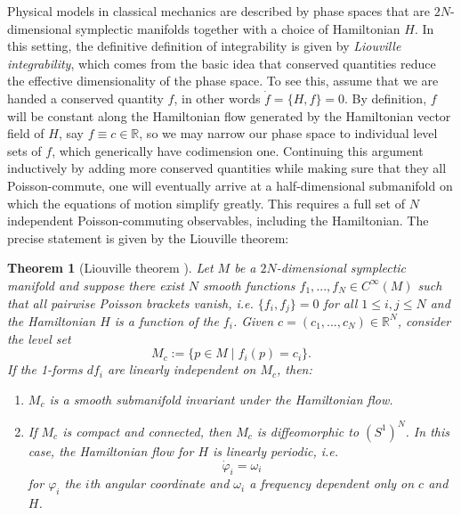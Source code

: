 \documentclass[11pt]{report}
\newtheorem{theorem}{Theorem}[section]
\theoremstyle{definition}
\theoremstyle{remark}
\theoremstyle{remark}
\newcommand{\R}{\mathbb{R}}
\begin{document}
Physical models in classical mechanics are described by phase spaces that are $2N$-dimensional symplectic manifolds together with a choice of Hamiltonian $H$. In this setting, the definitive definition of integrability is given by \emph{Liouville integrability}, which comes from the basic idea that conserved quantities reduce the effective dimensionality of the phase space. To see this, assume that we are handed a conserved quantity $f$, in other words $\dot f = \{ H, f \} = 0$. By definition, $f$ will be constant along the Hamiltonian flow generated by the Hamiltonian vector field of $H$, say $f \equiv c \in \R$, so we may narrow our phase space to individual level sets of $f$, which generically have codimension one. Continuing this argument inductively by adding more conserved quantities while making sure that they all Poisson-commute, one will eventually arrive at a half-dimensional submanifold on which the equations of motion simplify greatly. This requires a full set of $N$ independent Poisson-commuting observables, including the Hamiltonian. The precise statement is given by the Liouville theorem:

\begin{theorem}[Liouville theorem \cite{book:arnold}]
Let $M$ be a $2N$-dimensional symplectic manifold and suppose there exist $N$ smooth functions $f_1,...,f_N \in C^\infty(M)$ such that all pairwise Poisson brackets vanish, \emph{i.e.} $\{ f_i,f_j \} = 0$ for all $1 \leq i,j \leq N$ and the Hamiltonian $H$ is a function of the $f_i$. Given $c = (c_1,...,c_N) \in \R^N$, consider the level set
\begin{equation*}
M_c := \{ p \in M \mid f_i(p) = c_i \}.
\end{equation*}
If the 1-forms $df_i$ are linearly independent on $M_c$, then:
\begin{enumerate}[label=(\roman*)]
\item $M_c$ is a smooth submanifold invariant under the Hamiltonian flow.
\item If $M_c$ is compact and connected, then $M_c$ is diffeomorphic to $(S^1)^N$. In this case, the Hamiltonian flow for $H$ is linearly periodic, \emph{i.e.}
\begin{equation*}
\dot \varphi_i = \omega_i
\end{equation*}
for $\varphi_i$ the $i$th angular coordinate and $\omega_i$ a frequency dependent only on $c$ and $H$.
\end{enumerate}
\end{theorem}
\end{document}
